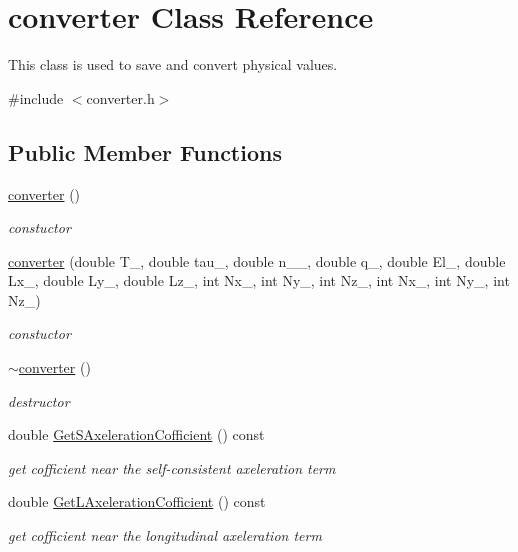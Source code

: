 \hypertarget{classconverter}{}\section{converter Class Reference}
\label{classconverter}


This class is used to save and convert physical values.  




{\ttfamily \#include $<$converter.\+h$>$}

\subsection*{Public Member Functions}
\begin{DoxyCompactItemize}
\item 
\mbox{\hyperlink{classconverter_a739bb1c56d40ec92d168670fa96743eb}{converter}} ()
\begin{DoxyCompactList}\small\item\em constuctor \end{DoxyCompactList}\item 
\mbox{\hyperlink{classconverter_ab0baf1f442a7119d458300f0d15ad526}{converter}} (double T\+\_\+, double tau\+\_\+, double n\+\_\+\_\+, double q\+\_\+, double El\+\_\+, double Lx\+\_\+, double Ly\+\_\+, double Lz\+\_\+, int Nx\+\_\+, int Ny\+\_\+, int Nz\+\_\+, int Nx\+\_, int Ny\+\_, int Nz\+\_)
\begin{DoxyCompactList}\small\item\em constuctor \end{DoxyCompactList}\item 
\mbox{\hyperlink{classconverter_ad8feb2580c06b85cc60f643cc36c47ab}{$\sim$converter}} ()
\begin{DoxyCompactList}\small\item\em destructor \end{DoxyCompactList}\item 
double \mbox{\hyperlink{classconverter_a560c30ce21d05ac22ab8dcb84caf2e43}{Get\+S\+Axeleration\+Cofficient}} () const
\begin{DoxyCompactList}\small\item\em get cofficient near the self-\/consistent axeleration term \end{DoxyCompactList}\item 
double \mbox{\hyperlink{classconverter_a671ceabb409c6401cc3b84e1b56e9497}{Get\+L\+Axeleration\+Cofficient}} () const
\begin{DoxyCompactList}\small\item\em get cofficient near the longitudinal axeleration term \end{DoxyCompactList}\item 

\end{DoxyCompactItemize}
